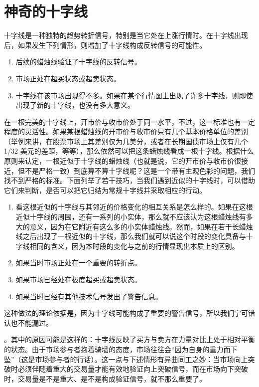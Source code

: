 \chapter{神奇的十字线\label{ch08}}
十字线是一种独特的趋势转折信号，特别是当它处在上涨行情时。在十字线出现后，如果发生下列情形，则增加了十字线构成反转信号的可能性。

\begin{enumerate}
    \item 后续的蜡烛线验证了十字线的反转信号。
    \item 市场正处在超买状态或超卖状态。
    \item 十字线在该市场出现得不多。如果在某个行情图上出现了许多十字线，则即使出现了新的十字线，也没有多大意义。
\end{enumerate}

在一根完美的十字线上，开市价与收市价处于同一水平，不过，这一标准也有一定程度的灵活性。如果某根蜡烛线的开市价与收市价只有几个基本价格单位的差别（举例来讲，在股票市场上其差别仅为几美分，或者在长期国债市场上仅有几个 1/32 美元的差距，等等），那么依然可以把这条蜡烛线看成一根十字线。根据什么原则来认定，一根近似于十字线的蜡烛线（也就是说，它的开市价与收市价很接近，但不是严格一致）到底算不算十字线呢？这是一个带有主观色彩的问题，我们找不到严格的标准。下面列举了若干技巧，当我们遇到近似的十字线时，可以借助它们来判断，是否可以把它归结为常规十字线并采取相应的行动。

\begin{enumerate}
    \item 看这根近似的十字线与其邻近的价格变化的相互关系是怎么样的。如果在这根近似十字线的周围，还有一系列的小实体，那么就不应该认为这根蜡烛线有多大的意义，因为在它附近有这么多的小实体蜡烛线。然而，如果在若干长蜡烛线之后出现了一根近似的十字线，那么我们就可以说这个时段的变化具备与十字线相同的含义，因为本时段的变化与之前的行情显现出本质上的区别。
    \item 如果当时市场正处在一个重要的转折点。
    \item 如果市场已经处在极度超买或超卖状态。
    \item 如果当时已经有其他技术信号发出了警告信息。
\end{enumerate}
这种做法的理论依据是，因为十字线可能构成了重要的警告信号，所以我们宁可错认也不能漏过。

。其中的原因可能是这样的：十字线反映了买方与卖方在力量对比上处于相对平衡的状态。由于市场参与者抱着骑墙的态度，市场往往会“因为自身的重力而下坠”（这是市场参与者的行话）。这一点与下述情形有异曲同工之妙：当市场向上突破时必须伴随着重大的交易量才能有效地验证向上突破信号，而在市场向下突破时，交易量是不是重大、是不是构成验证信号，就不那么重要了。

